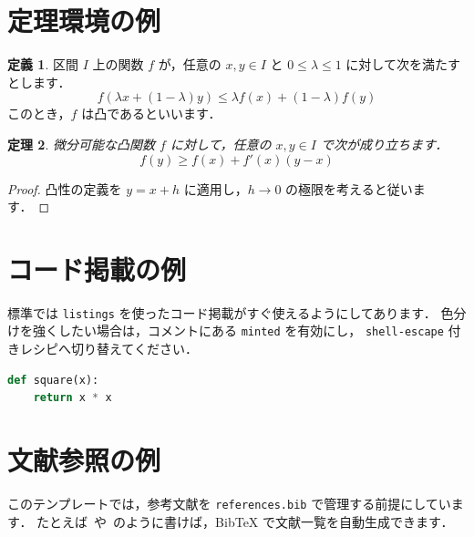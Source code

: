 \documentclass[12pt,a4paper,titlepage]{ltjsarticle}
\theoremstyle{plain}
\newtheorem{theorem}{定理}[section]
\theoremstyle{definition}
\newtheorem{definition}[theorem]{定義}
\theoremstyle{remark}
\begin{document}
\section{定理環境の例}
\begin{definition}
    区間 \(I\) 上の関数 \(f\) が，任意の \(x,y\in I\) と \(0 \le \lambda \le 1\) に対して次を満たすとします．
    \[
        f(\lambda x + (1-\lambda)y) \le \lambda f(x) + (1-\lambda)f(y)
    \]
    このとき，\(f\) は凸であるといいます．
\end{definition}

\begin{theorem}\label{thm:supporting-line}
    微分可能な凸関数 \(f\) に対して，任意の \(x,y\in I\) で次が成り立ちます．
    \[
        f(y) \ge f(x) + f'(x)(y-x)
    \]
\end{theorem}

\begin{proof}
    凸性の定義を \(y=x+h\) に適用し，\(h \to 0\) の極限を考えると従います．
\end{proof}

\section{コード掲載の例}
標準では \texttt{listings} を使ったコード掲載がすぐ使えるようにしてあります．
色分けを強くしたい場合は，コメントにある \texttt{minted} を有効にし，
\texttt{shell-escape} 付きレシピへ切り替えてください．

\begin{lstlisting}[language=Python,caption={Python の簡単な例},label={lst:sample-python}]
def square(x):
    return x * x
\end{lstlisting}

\section{文献参照の例}
このテンプレートでは，参考文献を \texttt{references.bib} で管理する前提にしています．
たとえば~\cite{latexcompanion}や~\cite{okumura}のように書けば，BibTeX で文献一覧を自動生成できます．



\end{document}
